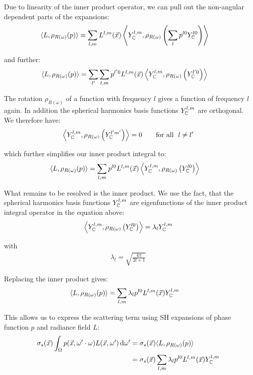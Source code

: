 \documentclass[10pt]{scrartcl}
\begin{document}
Due to linearity of the inner product operator, we can pull out the non-angular dependent parts of the expansions:
\begin{align*}
\langle L,  \rho_{R(\omega)}(p)\rangle
&=
\sum_{l,m}
{
L^{l,m}(\vec{x})
\left<
Y_{\mathbb{C}}^{l,m},
\rho_{R(\omega)}
\left(\sum_l{p^{l0} Y_{\mathbb{C}}^{l0}}\right)
\right>
}
\end{align*}


and further:
\begin{align*}
\langle L,  \rho_{R(\omega)}(p)\rangle
&=
\sum_{l'}
{
\sum_{l,m}
{
p^{l'0}L^{l,m}(\vec{x})
\left<Y_{\mathbb{C}}^{l,m}, \rho_{R(\omega)}\left( Y_{\mathbb{C}}^{l'0} \right)\right>
}
}
\end{align*}

The rotation $\rho_{R(\omega)}$ of a function with frequency $l$ gives a function of frequency $l$ again. In addition the spherical harmonics basis functions $Y_{\mathbb{C}}^{l,m}$ are orthogonal. We therefore have:
\begin{align*}
\left<
Y_{\mathbb{C}}^{l,m}, \rho_{R(\omega)}\left(Y_{\mathbb{C}}^{l'm'}\right)
\right> = 0       \qquad    \text{for all}\ \ l\ne l' 
\end{align*}

which further simplifies our inner product integral to:
\begin{align*}
\langle L,  \rho_{R(\omega)}(p)\rangle
&=
\sum_{l,m}
{
p^{l0}L^{l,m}(\vec{x})
\left<
Y_{\mathbb{C}}^{l,m}, \rho_{R(\omega)}\left(Y_{\mathbb{C}}^{l0} \right )
\right>
}
\end{align*}

What remains to be resolved is the inner product. We use the fact, that the spherical harmonics basis functions $ Y_{\mathbb{C}}^{l,m}$ are eigenfunctions of the inner product integral operator in the equation above:
\begin{align*}
\left<
Y_{\mathbb{C}}^{l,m}, \rho_{R(\omega)}\left ( Y_{\mathbb{C}}^{l0} \right )\right> = \lambda_l Y_{\mathbb{C}}^{l,m}
\end{align*}

with
\begin{align*}
\lambda_l=\sqrt{\frac{4\pi}{2l+1}}
\end{align*}


Replacing the inner product gives:
\begin{align*}
\langle L,  \rho_{R(\omega)}(p)\rangle
&=
\sum_{l,m}
{
\lambda_l
p^{l0}L^{l,m}(\vec{x})
Y_{\mathbb{C}}^{l,m}
}
\end{align*}

This allows us to express the scattering term using SH expansions of phase function $p$ and radiance field $L$:
\begin{align*}
\sigma_s(\vec{x})\int_{\Omega}p(\vec{x}, \omega'\cdot\omega)L(\vec{x}, \omega')\,\mathrm{d}\omega'
&=
\sigma_s(\vec{x})\langle L,  \rho_{R(\omega)}(p)\rangle
\\
&=
\sigma_s(\vec{x})
\sum_{l,m}
{
\lambda_l
p^{l0}L^{l,m}(\vec{x})
Y_{\mathbb{C}}^{l,m}
}
\end{align*}
\end{document}
